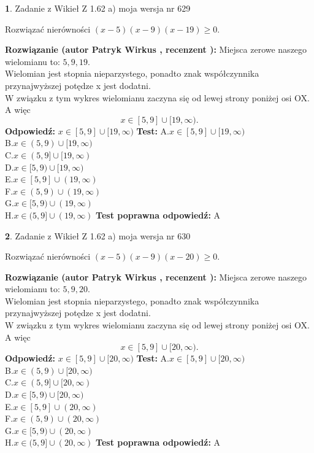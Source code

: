 \documentclass[12pt, a4paper]{article}
\theoremstyle{definition} %
\newtheorem{zad}{}
\newcommand{\zadStart}[1]{\begin{zad}#1\newline}
\newcommand{\zadStop}{\end{zad}}
\newcommand{\rozwStart}[2]{\noindent \textbf{Rozwiązanie (autor #1 , recenzent #2): }\newline}
\newcommand{\rozwStop}{\newline}
\newcommand{\odpStart}{\noindent \textbf{Odpowiedź:}\newline}
\newcommand{\odpStop}{\newline}
\newcommand{\testStart}{\noindent \textbf{Test:}\newline}
\newcommand{\testStop}{\newline}
\newcommand{\kluczStart}{\noindent \textbf{Test poprawna odpowiedź:}\newline}
\newcommand{\kluczStop}{\newline}
\begin{document}
\zadStart{Zadanie z Wikieł Z 1.62 a) moja wersja nr 629}

Rozwiązać nierówności $(x-5)(x-9)(x-19)\ge0$.
\zadStop
\rozwStart{Patryk Wirkus}{}
Miejsca zerowe naszego wielomianu to: $5, 9, 19$.\\
Wielomian jest stopnia nieparzystego, ponadto znak współczynnika przy\linebreak najwyższej potędze x jest dodatni.\\ W związku z tym wykres wielomianu zaczyna się od lewej strony poniżej osi OX. A więc $$x \in [5,9] \cup [19,\infty).$$
\rozwStop
\odpStart
$x \in [5,9] \cup [19,\infty)$
\odpStop
\testStart
A.$x \in [5,9] \cup [19,\infty)$\\
B.$x \in (5,9) \cup [19,\infty)$\\
C.$x \in (5,9] \cup [19,\infty)$\\
D.$x \in [5,9) \cup [19,\infty)$\\
E.$x \in [5,9] \cup (19,\infty)$\\
F.$x \in (5,9) \cup (19,\infty)$\\
G.$x \in [5,9) \cup (19,\infty)$\\
H.$x \in (5,9] \cup (19,\infty)$
\testStop
\kluczStart
A
\kluczStop



\zadStart{Zadanie z Wikieł Z 1.62 a) moja wersja nr 630}

Rozwiązać nierówności $(x-5)(x-9)(x-20)\ge0$.
\zadStop
\rozwStart{Patryk Wirkus}{}
Miejsca zerowe naszego wielomianu to: $5, 9, 20$.\\
Wielomian jest stopnia nieparzystego, ponadto znak współczynnika przy\linebreak najwyższej potędze x jest dodatni.\\ W związku z tym wykres wielomianu zaczyna się od lewej strony poniżej osi OX. A więc $$x \in [5,9] \cup [20,\infty).$$
\rozwStop
\odpStart
$x \in [5,9] \cup [20,\infty)$
\odpStop
\testStart
A.$x \in [5,9] \cup [20,\infty)$\\
B.$x \in (5,9) \cup [20,\infty)$\\
C.$x \in (5,9] \cup [20,\infty)$\\
D.$x \in [5,9) \cup [20,\infty)$\\
E.$x \in [5,9] \cup (20,\infty)$\\
F.$x \in (5,9) \cup (20,\infty)$\\
G.$x \in [5,9) \cup (20,\infty)$\\
H.$x \in (5,9] \cup (20,\infty)$
\testStop
\kluczStart
A
\kluczStop
\end{document}
